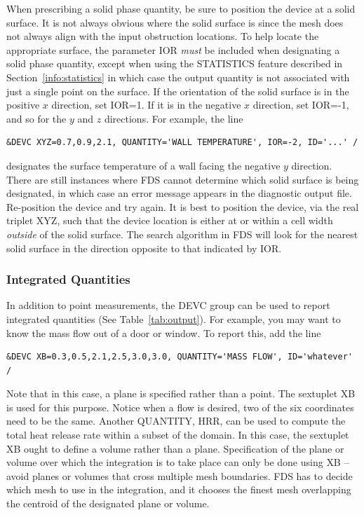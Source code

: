 \documentclass[11pt]{book}
\begin{document}
When prescribing a solid phase quantity, be sure to position the device at a solid surface. It is not always obvious where the solid surface is since the mesh does not always align with the input obstruction locations. To help locate the appropriate surface, the parameter {\ct IOR} {\em must} be included when designating a solid phase quantity, except when using the {\ct STATISTICS} feature described in Section~\ref{info:statistics} in which case the output quantity is not associated with just a single point on the surface. If the orientation of the solid surface is in the positive $x$ direction, set {\ct IOR=1}. If it is in the negative $x$ direction, set {\ct IOR=-1}, and so for the $y$ and $z$ directions. For example, the line
\begin{lstlisting}
&DEVC XYZ=0.7,0.9,2.1, QUANTITY='WALL TEMPERATURE', IOR=-2, ID='...' /
\end{lstlisting}
designates the surface temperature of a wall facing the negative $y$ direction. There are still instances where FDS cannot determine which solid surface is being designated, in which case an error message appears in the diagnostic output file. Re-position the device and try again. It is best to position the device, via the real triplet {\ct XYZ}, such that the device location is either at or within a cell width {\it outside} of the solid surface. The search algorithm in FDS will look for the nearest solid surface in the direction opposite to that indicated by {\ct IOR}.

\subsubsection{Integrated Quantities}

In addition to point measurements, the {\ct DEVC} group can be used to report integrated quantities (See Table~\ref{tab:output}). For example, you may want to know the mass flow out of a door or window. To report this, add the line
\begin{lstlisting}
&DEVC XB=0.3,0.5,2.1,2.5,3.0,3.0, QUANTITY='MASS FLOW', ID='whatever' /
\end{lstlisting}
Note that in this case, a plane is specified rather than a point. The sextuplet {\ct XB} is used for this purpose. Notice when a flow is desired, two of the six coordinates need to be the same. Another {\ct QUANTITY}, {\ct HRR}, can be used to compute the total heat release rate within a subset of the domain. In this case, the sextuplet {\ct XB} ought to define a volume rather than a plane. Specification of the plane or volume over which the integration is to take place can only be done using {\ct XB} -- avoid planes or volumes that cross multiple mesh boundaries. FDS has to decide which mesh to use in the integration, and it chooses the finest mesh overlapping the centroid of the designated plane or volume.
\end{document}
